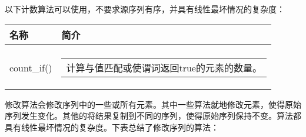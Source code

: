 
以下计数算法可以使用，不要求源序列有序，并具有线性最坏情况的复杂度：

\begin{longtable}{|l|l|}
\hline
\textbf{名称} &
\textbf{简介} \\ \hline
\endfirsthead
%
\endhead
%
\begin{tabular}[c]{@{}l@{}}count()\\ count\_if()\end{tabular} &
\begin{tabular}[c]{@{}l@{}}计算与值匹配或使谓词返回true的元素的数量。
\end{tabular} \\ \hline
\end{longtable}


修改算法会修改序列中的一些或所有元素。其中一些算法就地修改元素，使得原始序列发生变化。其他的将结果复制到不同的序列，使得原始序列保持不变。算法都具有线性最坏情况的复杂度。下表总结了修改序列的算法：

